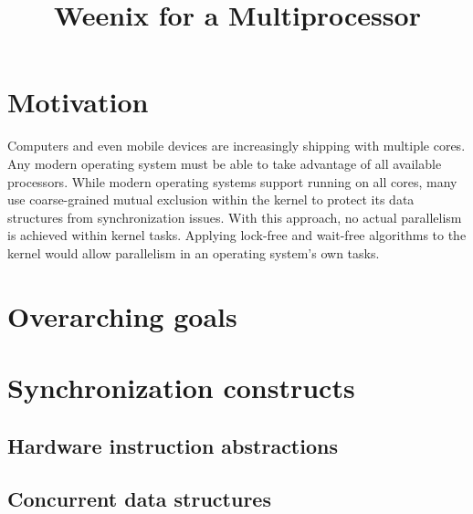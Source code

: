 \documentclass{article}
\begin{document}
\title{Weenix for a Multiprocessor}

\maketitle

\section{Motivation}

Computers and even mobile devices are increasingly shipping with multiple cores. Any modern
operating system must be able to take advantage of all available processors. While modern
operating systems support running on all cores, many use coarse-grained mutual exclusion 
within the kernel to protect its data structures from synchronization issues. With this
approach, no actual parallelism is achieved within kernel tasks. Applying lock-free and 
wait-free algorithms to the kernel would allow parallelism in an operating system's own
tasks.

\section{Overarching goals}

\section{Synchronization constructs}

\subsection{Hardware instruction abstractions}

\subsection{Concurrent data structures}
\end{document}
